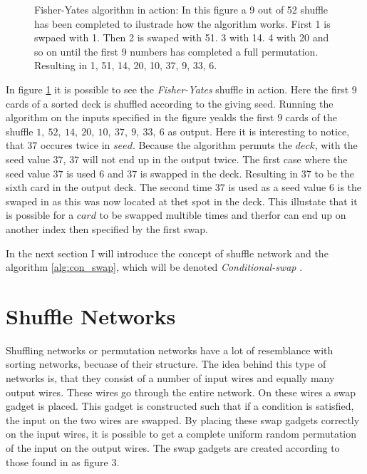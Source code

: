 \documentclass[twoside,11pt,openright]{report}
\newcommand{\FY}{\textit{Fisher-Yates} }
\newcommand{\CS}{\textit{Conditional-swap} }
\begin{document}
\begin{figure}[t]
\centering
\scalebox{1.5}{}
\caption{Fisher-Yates algorithm in action: In this figure a 9 out of 52 shuffle has been completed to ilustrade how the algorithm works. First 1 is swpaed with 1. Then 2 is swaped with 51. 3 with 14. 4 with 20 and so on until the first 9 numbers has completed a full permutation. Resulting in 1, 51, 14, 20, 10, 37, 9, 33, 6.}
\label{fig:fisher_yates}
\end{figure}

In figure \ref{fig:fisher_yates} it is possible to see the \FY shuffle in action. Here the first $9$ cards of a sorted deck is shuffled according to the giving seed. Running the algorithm on the inputs specified in the figure yealds the first $9$ cards of the shuffle $1,~52,~14,~20,~10,~37,~9,~33,~6$ as output. Here it is interesting to notice, that $37$ occures twice in $seed$. Because the algorithm permuts the $deck$, with the seed value $37$, $37$ will not end up in the output twice. The first case where the seed value $37$ is used $6$ and $37$ is swapped in the deck. Resulting in $37$ to be the sixth card in the output deck. The second time $37$ is used as a seed value $6$ is the swaped in as this was now located at thet spot in the deck. This illustate that it is possible for a $card$ to be swapped multible times and therfor can end up on another index then specified by the first swap.

\bigskip

In the next section I will introduce the concept of shuffle network and the algorithm \ref{alg:con_swap}, which will be denoted \CS.


\section{Shuffle Networks}
Shuffling networks or permutation networks have a lot of resemblance with sorting networks, becuase of their structure. The idea behind this type of networks is, that they consist of a number of input wires and equally many output wires. These wires go through the entire network. On these wires a swap gadget is placed. This gadget is constructed such that if a condition is satisfied, the input on the two wires are swapped. By placing these swap gadgets correctly on the input wires, it is possible to get a complete uniform random permutation of the input on the output wires. The swap gadgets are created according to those found in \cite{psi} as figure 3.
\end{document}
